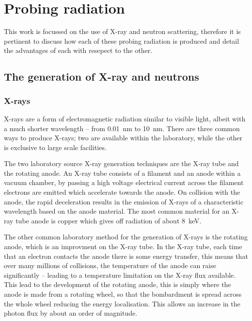 \section{Probing radiation}

This work is focussed on the use of X-ray and neutron scattering, therefore it is pertinent to discuss how each of these probing radiation is produced and detail the advantages of each with resepect to the other.

\subsection{The generation of X-ray and neutrons}

\subsubsection{X-rays}

X-rays are a form of electromagnetic radiation similar to visible light, albeit with a much shorter wavelength -- from \SI{0.01}{\nano\meter} to \SI{10}{\nano\meter}. There are three common ways to produce X-rays; two are available within the laboratory, while the other is exclusive to large scale facilities.

The two laboratory source X-ray generation techniques are the X-ray tube and the rotating anode. An X-ray tube consists of a filament and an anode within a vacuum chamber, by passing a high voltage electrical current across the filament electrons are emitted which accelerate towards the anode. On collision with the anode, the rapid deceleration results in the emission of X-rays of a characteristic wavelength based on the anode material.\cite{Schnablegger2017} The most common material for an X-ray tube anode is copper which gives off radiation of about \SI{8}{\kilo\eV}.

The other common laboratory method for the generation of X-rays is the rotating anode, which is an improvment on the X-ray tube. In the X-ray tube, each time that an electron contacts the anode there is some energy transfer, this means that over many millions of collisions, the temperature of the anode can raise significantly -- leading to a temperature limitation on the X-ray flux available. This lead to the development of the rotating anode, this is simply where the anode is made from a rotating wheel, so that the bombardment is spread across the whole wheel reducing the energy localisation. This allows an increase in the photon flux by about an order of magnitude.\cite{Schnablegger2017}

